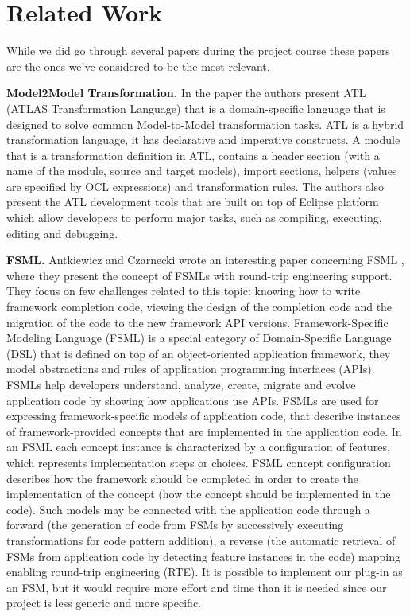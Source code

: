 \section{Related Work}
\label{relatedwork}
While we did go through several papers during the project course these papers are the ones we've considered to be the most relevant.

\textbf{Model2Model Transformation.} In the paper \cite{atl} the authors present ATL (ATLAS Transformation Language) that is a domain-specific language that is designed to solve common Model-to-Model transformation tasks. ATL is a hybrid transformation language, it has declarative and imperative constructs. A module that is a transformation definition in ATL, contains a header section (with a name of the module, source and target models), import sections, helpers (values are specified by OCL expressions) and transformation rules. The authors also present the ATL development tools that are built on top of Eclipse platform which allow developers to perform major tasks, such as compiling, executing, editing and debugging.


\textbf{FSML.} Antkiewicz and Czarnecki wrote an interesting paper concerning FSML \cite{FSML}, where they present the concept of FSMLs with round-trip engineering support. They focus on few challenges related to this topic: knowing how to write framework completion code, viewing the design of the completion code and the migration of the code to the new framework API versions. Framework-Specific Modeling Language (FSML) is a special category of Domain-Specific Language (DSL) that is defined on top of an object-oriented application framework, they model abstractions and rules of application programming interfaces (APIs). FSMLs help developers understand, analyze, create, migrate and evolve application code by showing how applications use APIs. FSMLs are used for expressing framework-specific models of application code, that describe instances of framework-provided concepts that are implemented in the application code. In an FSML each concept instance is characterized by a configuration of features, which represents implementation steps or choices. FSML concept configuration describes how the framework should be completed in order to create the implementation of the concept (how the concept should be implemented in the code). Such models may be connected with the application code through a forward (the generation of code from FSMs by successively executing transformations for code pattern addition), a reverse (the automatic retrieval of FSMs from application code by detecting feature instances in the code) mapping enabling round-trip engineering (RTE). It is possible to implement our plug-in as an FSM, but it would require more effort and time than it is needed since our project is less generic and more specific.
